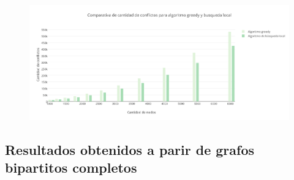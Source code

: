  \begin{figure}[H]
    \begin{center}
  	\includegraphics[width=18cm]{imagenes/Ej5/ComparacionConflictosCompleto.png}
 	\label{ComparacionConflictosCompleto}
    \end{center}
  \end{figure}

\subsection {Resultados obtenidos a parir de grafos bipartitos completos} 